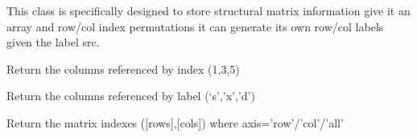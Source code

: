 \documentclass[letterpaper,10pt,english]{sphinxmanual}
\begin{document}

\begin{fulllineitems}
\label{\detokenize{modules_doc:cbmpy.CBCommon.StructMatrix}}
\pysigstartsignatures
{}
\pysigstopsignatures
\sphinxAtStartPar
This class is specifically designed to store structural matrix information
give it an array and row/col index permutations it can generate its own
row/col labels given the label src.

\begin{fulllineitems}
\label{\detokenize{modules_doc:cbmpy.CBCommon.StructMatrix.getColsByIdx}}
\pysigstartsignatures
{}
\pysigstopsignatures
\sphinxAtStartPar
Return the columns referenced by index (1,3,5)

\end{fulllineitems}


\begin{fulllineitems}
\label{\detokenize{modules_doc:cbmpy.CBCommon.StructMatrix.getColsByName}}
\pysigstartsignatures
{}
\pysigstopsignatures
\sphinxAtStartPar
Return the columns referenced by label (‘s’,’x’,’d’)

\end{fulllineitems}


\begin{fulllineitems}
\label{\detokenize{modules_doc:cbmpy.CBCommon.StructMatrix.getIndexes}}
\pysigstartsignatures
{}
\pysigstopsignatures
\sphinxAtStartPar
Return the matrix indexes ({[}rows{]},{[}cols{]}) where axis=’row’/’col’/’all’


\end{fulllineitems}
\end{fulllineitems}
\end{document}
